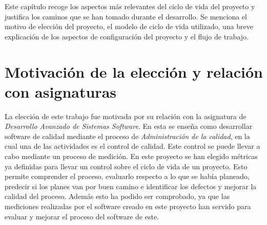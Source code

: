 


Este capítulo recoge los aspectos más relevantes del ciclo de vida del proyecto y justifica los caminos que se han tomado durante el desarrollo. Se menciona el motivo de elección del proyecto, el modelo de ciclo de vida utilizado, una breve explicación de los aspectos de configuración del proyecto y el flujo de trabajo.

\section{Motivación de la elección y relación con asignaturas}

La elección de este trabajo fue motivada por su relación con la asignatura de \textit{Desarrollo Avanzado de Sistemas Software}. En esta se enseña como desarrollar software de calidad mediante el proceso de \textit{Administración de la calidad}, en la cual una de las actividades es el control de calidad. Este control se puede llevar a cabo mediante un proceso de medición. En este proyecto se han elegido métricas ya definidas para llevar un control sobre el ciclo de vida de un proyecto. Esto permite comprender el proceso, evaluarlo respecto a lo que se había planeado, predecir si los planes van por buen camino e identificar los defectos y mejorar la calidad del proceso. Además esto ha podido ser comprobado, ya que las mediciones realizadas por el software creado en este proyecto han servido para evaluar y mejorar el proceso del software de este.

